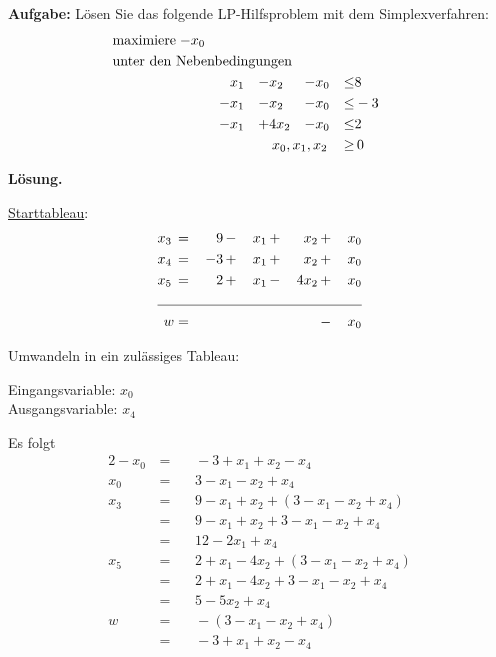 \documentclass[10pt,a4paper,oneside,ngerman,numbers=noenddot]{scrartcl}
\begin{document}
	\subsection{} %
		\textbf{Aufgabe:} Lösen Sie das folgende LP-Hilfsproblem mit dem Simplexverfahren:
		\begin{alignat*}{5}
			\text{maximiere}\; -& x_{0} && && && && \\
			\multicolumn{10}{l}{\text{unter den Nebenbedingungen}} && \\
			\; & && x_{1} &-& x_{2} &-& x_{0} &\leq & 8 \\
			\; & &-& x_{1} &-& x_{2} &-& x_{0} &\leq & -3 \\
			\; & &-& x_{1} &+& 4x_{2} &-& x_{0} &\leq & 2 \\
			\multicolumn{8}{r}{$x_{0}, x_{1}, x_{2}$} \,&\geq &\, 0
		\end{alignat*}
		
		\textbf{Lösung.}
		
		\underline{Starttableau}:
		\begin{alignat*}{5}
			x_{3} \,&=&\, 9 \,&-&\, x_{1} \,&+&\, x_{2} \,&+&\, x_{0} \\
			x_{4} \,&=&\, -3 \,&+&\, x_{1} \,&+&\, x_{2} \,&+&\, x_{0} \\
			x_{5} \,&=&\, 2 \,&+&\, x_{1} \,&-&\, 4x_{2} \,&+&\, x_{0} \\ \cline{1 - 9}
			w &=& && && \,&-&\, x_{0}
		\end{alignat*}
		
		Umwandeln in ein zulässiges Tableau:
				
		Eingangsvariable: $x_{0}$\\
		Ausgangsvariable: $x_{4}$
		
		Es folgt
		\begin{alignat*}{2}
			-x_{0} \,&=&&\, -3 + x_{1} + x_{2} - x_{4} \\
			x_{0} \,&=&&\, 3 - x_{1} - x_{2} + x_{4} \\			
			x_{3} \,&=&&\, 9 - x_{1} + x_{2} + \left(3 - x_{1} - x_{2} + x_{4}\right) \\			
			&=&&\, 9 - x_{1} + x_{2} + 3 - x_{1} - x_{2} + x_{4} \\
			&=&&\, 12 - 2x_{1} + x_{4} \\
			x_{5} \,&=&&\, 2 + x_{1} - 4x_{2} + \left(3 - x_{1} - x_{2} + x_{4}\right) \\
			&=&&\, 2 + x_{1} - 4x_{2} + 3 - x_{1} - x_{2} + x_{4} \\
			&=&&\, 5 - 5x_{2} + x_{4} \\
			w \,&=&&\, -\left(3 - x_{1} - x_{2} + x_{4}\right) \\
			&=&&\, -3 + x_{1} + x_{2} - x_{4} \\
		\end{alignat*}
		
\end{document}
